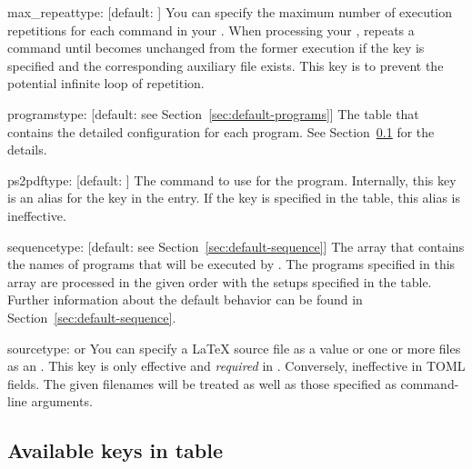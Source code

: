 \documentclass{llmk-doc}
\begin{document}
\begin{confkey}{max\_repeat}{type: }[default: ]
You can specify the maximum number of execution repetitions for each command in
your . When processing your ,  repeats
a command until  becomes unchanged from the former execution if
the key is specified and the corresponding auxiliary file exists. This key is to
prevent the potential infinite loop of repetition.
\end{confkey}

\begin{confkey}{programs}{type: }
  [default: see Section~\ref{sec:default-programs}]
The table that contains the detailed configuration for each program. See
Section~\ref{sec:keys-in-programs} for the details.
\end{confkey}

\begin{confkey}{ps2pdf}{type: }[default: ]
The command to use for the  program. Internally, this key is
an alias for the  key in the  entry. If the
 key is specified in the  table, this alias is
ineffective.
\end{confkey}

\begin{confkey}{sequence}{type: }
  [default: see Section~\ref{sec:default-sequence}]
The array that contains the names of programs that will be executed by
. The programs specified in this array are processed in the given
order with the setups specified in the  table. Further
information about the default behavior can be found in
Section~\ref{sec:default-sequence}.
\end{confkey}

\begin{confkey}{source}{type:  or }
You can specify a {\LaTeX} source file as a  value or one or more
files as an . This key is only effective and
\emph{required} in . Conversely, ineffective in TOML fields.
The given filenames will be treated as well as those specified as command-line
arguments.
\end{confkey}

\subsection{Available keys in  table}
\label{sec:keys-in-programs}
\end{document}
